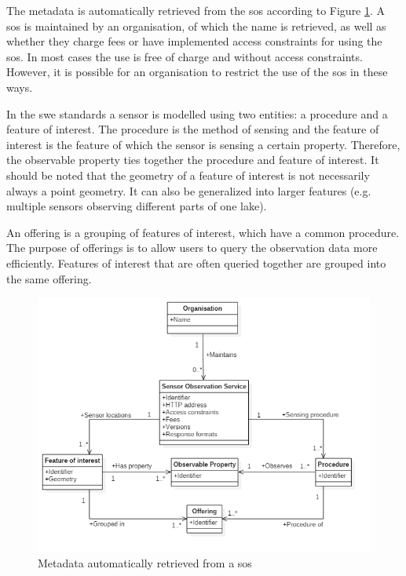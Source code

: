The metadata is automatically retrieved from the \ac{sos} according to Figure \ref{fig:SOS_UML}. A \ac{sos} is maintained by an organisation, of which the name is retrieved, as well as whether they charge fees or have implemented access constraints for using the \ac{sos}. In most cases the use is free of charge and without access constraints. However, it is possible for an organisation to restrict the use of the \ac{sos} in these ways. 

In the \ac{swe} standards a sensor is modelled using two entities: a procedure and a feature of interest. The procedure is the method of sensing and the feature of interest is the feature of which the sensor is sensing a certain property. Therefore, the observable property ties together the procedure and feature of interest. It should be noted that the geometry of a feature of interest is not necessarily always a point geometry. It can also be generalized into larger features (e.g. multiple sensors observing different parts of one lake). 

An offering is a grouping of features of interest, which have a common procedure. The purpose of offerings is to allow users to query the observation data more efficiently. Features of interest that are often queried together are grouped into the same offering.      
 

\begin{figure}
	\centering
	\includegraphics[width=\linewidth]{UML/SOS_UML.PNG}
	\caption{Metadata automatically retrieved from a \ac{sos}}
	\label{fig:SOS_UML}
\end{figure}

